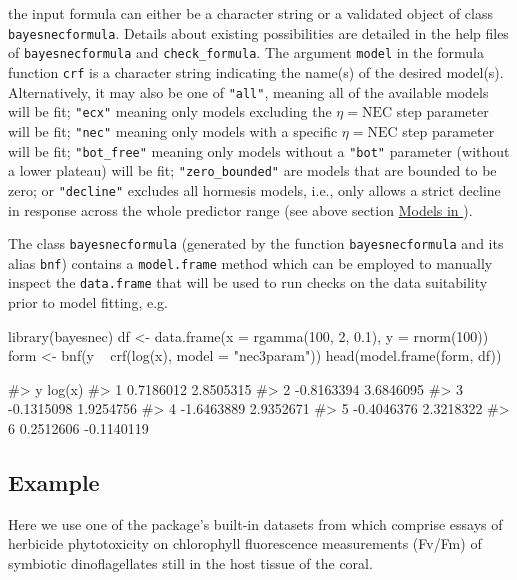 the input formula can either be a character string or a validated object
of class \texttt{bayesnecformula}. Details about existing possibilities
are detailed in the help files of \texttt{bayesnecformula} and
\texttt{check\_formula}. The argument \texttt{model} in the formula
function \texttt{crf} is a character string indicating the name(s) of
the desired model(s). Alternatively, it may also be one of
\texttt{"all"}, meaning all of the available models will be fit;
\texttt{"ecx"} meaning only models excluding the \(\eta = \text{NEC}\)
step parameter will be fit; \texttt{"nec"} meaning only models with a
specific \(\eta = \text{NEC}\) step parameter will be fit;
\texttt{"bot\_free"} meaning only models without a \texttt{"bot"}
parameter (without a lower plateau) will be fit;
\texttt{"zero\_bounded"} are models that are bounded to be zero; or
\texttt{"decline"} excludes all hormesis models, i.e., only allows a
strict decline in response across the whole predictor range (see above
section \protect\hyperlink{mdbnc}{Models in }).

The class \texttt{bayesnecformula} (generated by the function
\texttt{bayesnecformula} and its alias \texttt{bnf}) contains a
\texttt{model.frame} method which can be employed to manually inspect
the \texttt{data.frame} that will be used to run checks on the data
suitability prior to model fitting, e.g.

\begin{Schunk}
\begin{Sinput}
library(bayesnec)
df <- data.frame(x = rgamma(100, 2, 0.1), y = rnorm(100))
form <- bnf(y ~ crf(log(x), model = "nec3param"))
head(model.frame(form, df))
\end{Sinput}
\begin{Soutput}
#>            y     log(x)
#> 1  0.7186012  2.8505315
#> 2 -0.8163394  3.6846095
#> 3 -0.1315098  1.9254756
#> 4 -1.6463889  2.9352671
#> 5 -0.4046376  2.3218322
#> 6  0.2512606 -0.1140119
\end{Soutput}
\end{Schunk}

\hypertarget{example}{%
\subsection{Example}\label{example}}

Here we use one of the package's built-in datasets from
\citet{jones2003meps} which comprise essays of herbicide phytotoxicity
on chlorophyll fluorescence measurements (Fv/Fm) of symbiotic
dinoflagellates still in the host tissue of the coral.

